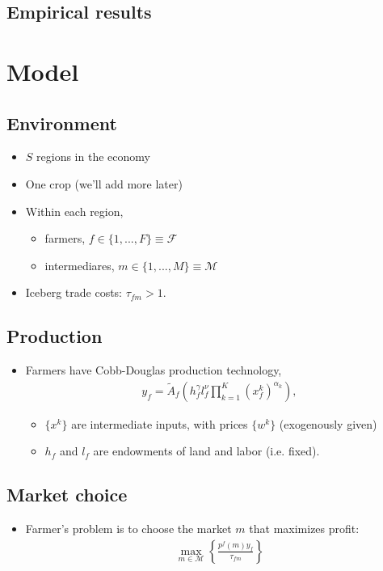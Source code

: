 \documentclass[12pt]{article}
\begin{document}
\subsection{Empirical results}

\newpage

\section{Model}
\subsection{Environment}
\begin{itemize}
\item $S$ regions in the economy
\item One crop (we'll add more later)
\item Within each region,
\begin{itemize}
\item farmers, $f\in \{1,...,F\} \equiv \mathcal{F}$
\item intermediares, $m \in  \{1,...,M\} \equiv \mathcal{M}$
\end{itemize}
\item Iceberg trade costs: $\tau_{fm}>1$.
\end{itemize}

\subsection{Production}
\begin{itemize}
\item Farmers have Cobb-Douglas production technology,
\begin{align*}
y_f = \tilde{A}_f\left(h_f^\gamma l_f^\nu \prod_{k=1}^K(x_f^k)^{\alpha_k}\right),
\end{align*}
\begin{itemize}
\item $\{x^k\}$ are intermediate inputs, with prices $\{w^k\}$ (exogenously given)
\item $h_f$ and $l_f$ are endowments of land and labor (i.e. fixed).
\end{itemize}
\end{itemize}

\subsection{Market choice}
\begin{itemize}
\item Farmer's problem is to choose the market $m$ that maximizes profit:
\begin{align*}
\max_{m \in \mathcal{M}} \left\{\frac{p^f(m)y_f}{\tau_{fm}}\right\}
\end{align*}
\end{itemize}
\end{document}
